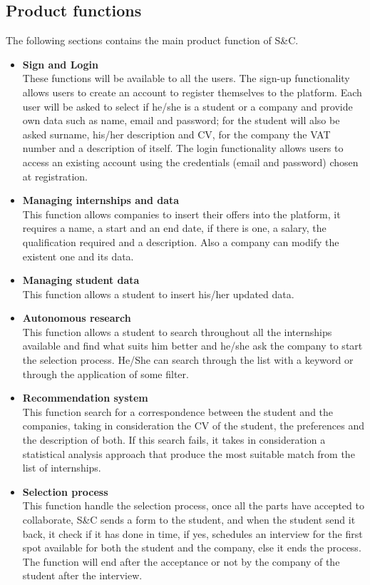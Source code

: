 \subsection{Product functions}
The following sections contains the main product function of S\&C.
\begin{itemize}
    \item \textbf{Sign and Login}\\
    These functions will be available to all the users. The sign-up functionality allows users to create an account to register themselves to the platform. Each user will be asked to select if he/she is a student or a company and provide own data such as name, email and password; for the student will also be asked surname, his/her description and CV, for the company the VAT number and a description of itself. The login functionality allows users to access an existing account using the credentials (email and password) chosen at registration. 
    \item \textbf{Managing internships and data}\\
    This function allows companies to insert their offers into the platform, it requires a name, a start and an end date, if there is one, a salary, the qualification required and a description. Also a company can modify the existent one and its data.
    \item \textbf{Managing student data}\\
    This function allows a student to insert his/her updated data.
    \item \textbf{Autonomous research}\\
    This function allows a student to search throughout all the internships available and find what suits him better and he/she ask the company to start the selection process. He/She can search through the list with a keyword or through the application of some filter. 
    \item \textbf{Recommendation system}\\
    This function search for a correspondence between the student and the companies, taking in consideration the CV of the student, the preferences and the description of both. If this search fails, it takes in consideration a statistical analysis approach that produce the most suitable match from the list of internships.
    \item \textbf{Selection process}\\
    This function handle the selection process, once all the parts have accepted to collaborate, S\&C sends a form to the student, and when the student send it back, it check if it has done in time, if yes, schedules an interview for the first spot available for both the student and the company, else it ends the process. The function will end after the acceptance or not by the company of the student after the interview. 
\end{itemize}

